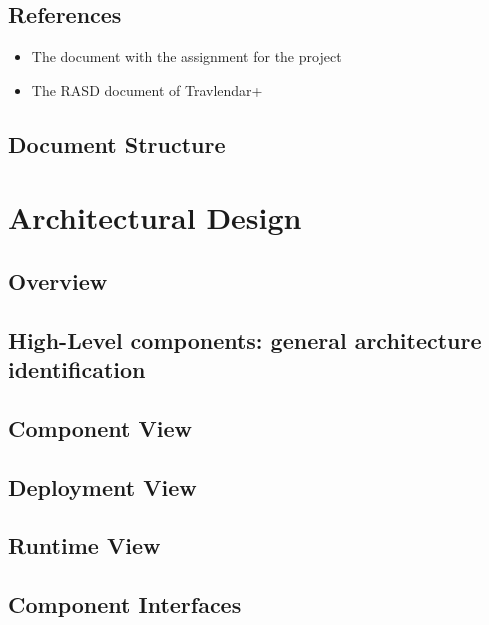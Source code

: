 \documentclass{article}
\begin{document}
\subsection{References}
\begin{itemize}
	\item The document with the assignment for the project
	\item The RASD document of Travlendar+
\end{itemize}
\subsection{Document Structure}


\clearpage
\section{Architectural Design}

\subsection{Overview}\label{overview}


\clearpage
\subsection{High-Level components: general architecture identification}\label{higharch}


\clearpage

\subsection{Component View}\label{componentview}

\subsection{Deployment View}\label{deploymentview}

\subsection{Runtime View}\label{runtimeview}

\subsection{Component Interfaces}\label{componentinterfaces}
\end{document}
